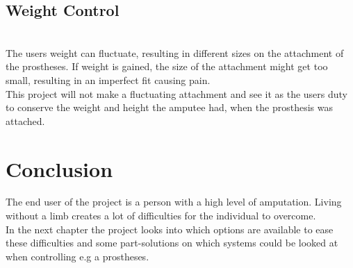 \subsection*{Weight Control}\\
The users weight can fluctuate, resulting in different sizes on the attachment of the prostheses. If weight is gained, the size of the attachment might get too small, resulting in an imperfect fit causing pain.\\
This project will not make a fluctuating attachment and see it as the users duty to conserve the weight and height the amputee had, when the prosthesis was attached\cite{weightControl}.

\section{Conclusion}
The end user of the project is a person with a high level of amputation. Living without a limb creates a lot of difficulties for the individual to overcome.\\
In the next chapter the project looks into which options are available to ease these difficulties and some part-solutions on which systems could be looked at when controlling e.g a prostheses. 